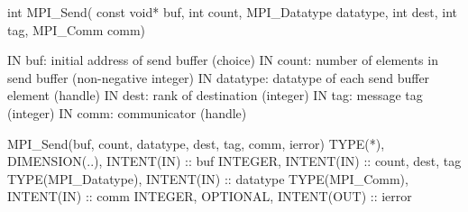 int MPI_Send(
  const void* buf, int count, MPI_Datatype datatype,
  int dest, int tag, MPI_Comm comm)

IN buf: initial address of send buffer (choice)
IN count: number of elements in send buffer (non-negative integer)
IN datatype: datatype of each send buffer element (handle)
IN dest: rank of destination (integer)
IN tag: message tag (integer)
IN comm: communicator (handle)

MPI_Send(buf, count, datatype, dest, tag, comm, ierror)
TYPE(*), DIMENSION(..), INTENT(IN) :: buf
INTEGER, INTENT(IN) :: count, dest, tag
TYPE(MPI_Datatype), INTENT(IN) :: datatype
TYPE(MPI_Comm), INTENT(IN) :: comm
INTEGER, OPTIONAL, INTENT(OUT) :: ierror 

